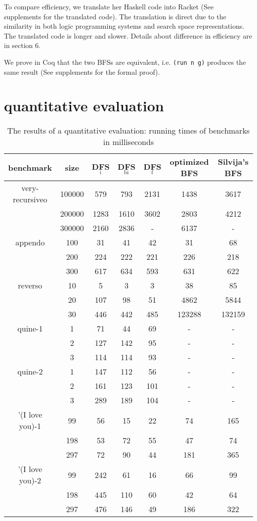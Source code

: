 \documentclass[format=acmlarge, review=true, authordraft=true]{acmart}
\begin{document}
To compare efficiency, we translate her Haskell code into Racket (See 
supplements for the translated code). The translation is direct 
due to the similarity in both logic programming systems and search space 
representations. The translated code is longer and slower. Details about 
difference in efficiency are in section 6.

We prove in Coq that the two BFSs are equivalent, i.e. \texttt{(run n g)} 
produces the same result (See supplements for the formal proof).

\section{quantitative evaluation}

\begin{table}
	\begin{tabular}{|c|c|c|c|c|c|c|}
		\hline 
		benchmark & size & DFS$_\textrm{i}$ & DFS$_\textrm{bi}$ & DFS$_\textrm{f}$ & optimized BFS & Silvija's BFS  
		\\
		\hline
		very-recursiveo & 100000 &  579 &  793 & 2131 & 1438 & 3617 \\
		& 200000 & 1283 & 1610 & 3602 & 2803 & 4212 \\
		& 300000 & 2160 & 2836 &    - & 6137 &    - \\
		\hline 
		appendo  & 100 &  31 &  41 &  42 &  31 &  68 \\ 
		& 200 & 224 & 222 & 221 & 226 & 218 \\ 
		& 300 & 617 & 634 & 593 & 631 & 622 \\ 
		\hline 
		reverso & 10 &   5 &   3 &   3 &     38 &     85 \\ 
		& 20 & 107 &  98 &  51 &   4862 &   5844 \\
		& 30 & 446 & 442 & 485 & 123288 & 132159 \\ 
		\hline
		quine-1 & 1 &  71 &  44 & 69 & - & - \\ 
		& 2 & 127 & 142 & 95 & - & - \\ 
		& 3 & 114 & 114 & 93 & - & - \\ 
		\hline
		quine-2 & 1 & 147 & 112 &  56 & - & - \\ 
		& 2 & 161 & 123 & 101 & - & - \\ 
		& 3 & 289 & 189 & 104 & - & - \\ 
		\hline 
		'(I love you)-1 &  99 & 56 & 15 & 22 &  74 & 165 \\ 
		& 198 & 53 & 72 & 55 &  47 &  74 \\
		& 297 & 72 & 90 & 44 & 181 & 365 \\ 
		\hline
		'(I love you)-2 &  99 & 242 &  61 & 16 &  66 &  99 \\ 
		& 198 & 445 & 110 & 60 &  42 &  64 \\
		& 297 & 476 & 146 & 49 & 186 & 322 \\ 
		\hline 
	\end{tabular}
	\caption{The results of a quantitative evaluation: running times of 
	benchmarks 
		in milliseconds}
	\label{compare-efficiency}
\end{table}
\end{document}
